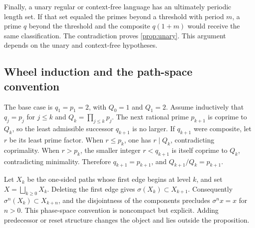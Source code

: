 Finally, a unary regular or context-free language has an ultimately periodic
length set.  If that set equaled the primes beyond a threshold with period
\(m\), a prime \(q\) beyond the threshold and the composite \(q(1+m)\) would
receive the same classification.  The contradiction proves
\cref{prop:unary}.  This argument depends on the unary and context-free
hypotheses.

\subsection{Wheel induction and the path-space convention}

The base case is \(q_1=p_1=2\), with \(Q_0=1\) and \(Q_1=2\).
Assume inductively that \(q_j=p_j\) for \(j\le k\) and
\(Q_k=\prod_{j\le k}p_j\).  The next rational prime \(p_{k+1}\) is coprime to
\(Q_k\), so the least admissible successor \(q_{k+1}\) is no larger.  If
\(q_{k+1}\) were composite, let \(r\) be its least prime factor.  When
\(r\le p_k\), one has \(r\mid Q_k\), contradicting coprimality.  When
\(r>p_k\), the smaller integer \(r<q_{k+1}\) is itself coprime to \(Q_k\),
contradicting minimality.  Therefore \(q_{k+1}=p_{k+1}\), and
\(Q_{k+1}/Q_k=p_{k+1}\).

Let \(X_k\) be the one-sided paths whose first edge begins at level \(k\), and
set \(X=\bigsqcup_{k\ge0}X_k\).  Deleting the first edge gives
\(\sigma(X_k)\subset X_{k+1}\).  Consequently
\(\sigma^n(X_k)\subset X_{k+n}\), and the disjointness of the components
precludes \(\sigma^n x=x\) for \(n>0\).  This phase-space convention is
noncompact but explicit.  Adding predecessor or reset structure changes the
object and lies outside the proposition.
